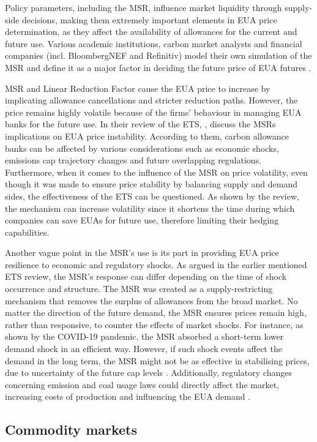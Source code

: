 \documentclass[12pt, letterpaper]{article}
\begin{document}
Policy parameters, including the MSR, influence market liquidity through supply-side decisions, making them extremely important elements in EUA price determination, as they affect the availability of allowances for the current and future use. Various academic institutions, carbon market analysts and financial companies (incl. BloombergNEF and Refinitiv) model their own simulation of the MSR and define it as a major factor in deciding the future price of EUA futures \parencite{ariadne2022}.

MSR and Linear Reduction Factor cause the EUA price to increase by implicating allowance cancellations and stricter reduction paths. However, the price remains highly volatile because of the firms’ behaviour in managing EUA banks for the future use. In their review of the ETS, \textcite{borghesi2023}, discuss the MSRs implications on EUA price instability. According to them, carbon allowance banks can be affected by various considerations such as economic shocks, emissions cap trajectory changes and future overlapping regulations. Furthermore, when it comes to the influence of the MSR on price volatility, even though it was made to ensure price stability by balancing supply and demand sides, the effectiveness of the ETS can be questioned. As shown by the review, the mechanism can increase volatility since it shortens the time during which companies can save EUAs for future use, therefore limiting their hedging capabilities.

Another vague point in the MSR’s use is its part in providing EUA price resilience to economic and regulatory shocks. As argued in the earlier mentioned ETS review, the MSR’s response can differ depending on the time of shock occurrence and structure. The MSR was created as a supply-restricting mechanism that removes the surplus of allowances from the broad market. No matter the direction of the future demand, the MSR ensures prices remain high, rather than responsive, to counter the effects of market shocks. For instance, as shown by the COVID-19 pandemic, the MSR absorbed a short-term lower demand shock in an efficient way. However, if such shock events affect the demand in the long term, the MSR might not be as effective in stabilising prices, due to uncertainty of the future cap levels \parencite{borghesi2023}. Additionally, regulatory changes concerning emission and coal usage laws could directly affect the market, increasing costs of production and influencing the EUA demand \parencite{salvagnin2024}.

\subsection{Commodity markets}
\end{document}
